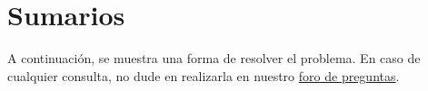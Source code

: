 \section{Sumarios}

A continuación, se muestra una forma de resolver el problema. En caso de cualquier consulta, no dude en realizarla en nuestro \href{https://aula.usm.cl/mod/forum/view.php?id=2654494}{foro de preguntas}.


